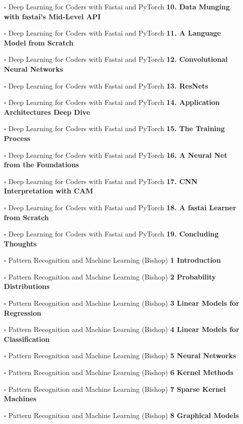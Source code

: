 \documentclass[a4, landscape, 12pt]{article}
\newcommand{\checkbox}{$\square$}%
\begin{document}
\begin{itemize}
{}
\item [\checkbox]  Deep Learning for Coders with Fastai and PyTorch \textbf{ 10. Data Munging with fastai's Mid-Level API
}
\item [\checkbox]  Deep Learning for Coders with Fastai and PyTorch \textbf{ 11. A Language Model from Scratch
}
\item [\checkbox]  Deep Learning for Coders with Fastai and PyTorch \textbf{ 12. Convolutional Neural Networks
}
\item [\checkbox]  Deep Learning for Coders with Fastai and PyTorch \textbf{ 13. ResNets
}
\item [\checkbox]  Deep Learning for Coders with Fastai and PyTorch \textbf{ 14. Application Architectures Deep Dive
}
\item [\checkbox]  Deep Learning for Coders with Fastai and PyTorch \textbf{ 15. The Training Process
}
\item [\checkbox]  Deep Learning for Coders with Fastai and PyTorch \textbf{ 16. A Neural Net from the Foundations
}
\item [\checkbox]  Deep Learning for Coders with Fastai and PyTorch \textbf{ 17. CNN Interpretation with CAM
}
\item [\checkbox]  Deep Learning for Coders with Fastai and PyTorch \textbf{ 18. A fastai Learner from Scratch
}
\item [\checkbox]  Deep Learning for Coders with Fastai and PyTorch \textbf{ 19. Concluding Thoughts
}
\item [\checkbox]  Pattern Recognition and Machine Learning (Bishop) \textbf{ 1 Introduction
}
\item [\checkbox]  Pattern Recognition and Machine Learning (Bishop) \textbf{ 2 Probability Distributions
}
\item [\checkbox]  Pattern Recognition and Machine Learning (Bishop) \textbf{ 3 Linear Models for Regression
}
\item [\checkbox]  Pattern Recognition and Machine Learning (Bishop) \textbf{ 4 Linear Models for Classification
}
\item [\checkbox]  Pattern Recognition and Machine Learning (Bishop) \textbf{ 5 Neural Networks
}
\item [\checkbox]  Pattern Recognition and Machine Learning (Bishop) \textbf{ 6 Kernel Methods
}
\item [\checkbox]  Pattern Recognition and Machine Learning (Bishop) \textbf{ 7 Sparse Kernel Machines
}
\item [\checkbox]  Pattern Recognition and Machine Learning (Bishop) \textbf{ 8 Graphical Models
}
\end{itemize}
\end{document}
